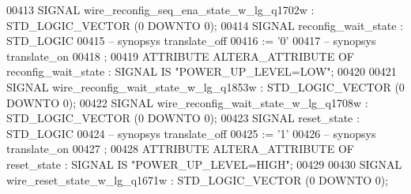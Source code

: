 \begin{DoxyCode}
{00413      \textcolor{keywordflow}{SIGNAL}  \textcolor{vhdlchar}{wire_reconfig_seq_ena_state_w_lg_q1702w}    \textcolor{vhdlchar}{:}   \textcolor{comment}{STD\_LOGIC\_VECTOR} \textcolor{vhdlchar}{(}\textcolor{vhdllogic}{}\textcolor{vhdllogic}{0} \textcolor{keywordflow}{DOWNTO} \textcolor{vhdllogic}{}\textcolor{vhdllogic}{0}\textcolor{vhdlchar}{)};
00414      \textcolor{keywordflow}{SIGNAL}  \textcolor{vhdlchar}{reconfig_wait_state}    \textcolor{vhdlchar}{:}   \textcolor{comment}{STD\_LOGIC}
00415 \textcolor{keyword}{     -- synopsys translate\_off}
00416       \textcolor{vhdlchar}{:=} \textcolor{vhdlchar}{'}\textcolor{vhdllogic}{}\textcolor{vhdllogic}{0}\textcolor{vhdlchar}{'}
00417 \textcolor{keyword}{     -- synopsys translate\_on}
00418      ;
00419      \textcolor{keywordflow}{ATTRIBUTE} \textcolor{vhdlchar}{ALTERA_ATTRIBUTE} \textcolor{keywordflow}{OF} \textcolor{vhdlchar}{reconfig_wait_state} \textcolor{vhdlchar}{:} \textcolor{keywordflow}{SIGNAL} \textcolor{keywordflow}{IS} \textcolor{keyword}{"POWER\_UP\_LEVEL=LOW"};
00420 
00421      \textcolor{keywordflow}{SIGNAL}  \textcolor{vhdlchar}{wire_reconfig_wait_state_w_lg_q1853w}   \textcolor{vhdlchar}{:}   \textcolor{comment}{STD\_LOGIC\_VECTOR} \textcolor{vhdlchar}{(}\textcolor{vhdllogic}{}\textcolor{vhdllogic}{0} \textcolor{keywordflow}{DOWNTO} \textcolor{vhdllogic}{}\textcolor{vhdllogic}{0}\textcolor{vhdlchar}{)};
00422      \textcolor{keywordflow}{SIGNAL}  \textcolor{vhdlchar}{wire_reconfig_wait_state_w_lg_q1708w}   \textcolor{vhdlchar}{:}   \textcolor{comment}{STD\_LOGIC\_VECTOR} \textcolor{vhdlchar}{(}\textcolor{vhdllogic}{}\textcolor{vhdllogic}{0} \textcolor{keywordflow}{DOWNTO} \textcolor{vhdllogic}{}\textcolor{vhdllogic}{0}\textcolor{vhdlchar}{)};
00423      \textcolor{keywordflow}{SIGNAL}  \textcolor{vhdlchar}{reset_state}    \textcolor{vhdlchar}{:}   \textcolor{comment}{STD\_LOGIC}
00424 \textcolor{keyword}{     -- synopsys translate\_off}
00425       \textcolor{vhdlchar}{:=} \textcolor{vhdlchar}{'}\textcolor{vhdllogic}{}\textcolor{vhdllogic}{1}\textcolor{vhdlchar}{'}
00426 \textcolor{keyword}{     -- synopsys translate\_on}
00427      ;
00428      \textcolor{keywordflow}{ATTRIBUTE} \textcolor{vhdlchar}{ALTERA_ATTRIBUTE} \textcolor{keywordflow}{OF} \textcolor{vhdlchar}{reset_state} \textcolor{vhdlchar}{:} \textcolor{keywordflow}{SIGNAL} \textcolor{keywordflow}{IS} \textcolor{keyword}{"POWER\_UP\_LEVEL=HIGH"};
00429 
00430      \textcolor{keywordflow}{SIGNAL}  \textcolor{vhdlchar}{wire_reset_state_w_lg_q1671w}   \textcolor{vhdlchar}{:}   \textcolor{comment}{STD\_LOGIC\_VECTOR} \textcolor{vhdlchar}{(}\textcolor{vhdllogic}{}\textcolor{vhdllogic}{0} \textcolor{keywordflow}{DOWNTO} \textcolor{vhdllogic}{}\textcolor{vhdllogic}{0}\textcolor{vhdlchar}{)};
}
\end{DoxyCode}
